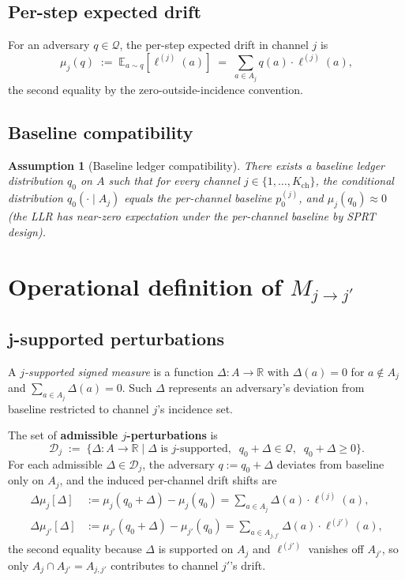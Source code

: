 \documentclass{article}
\newtheorem{assumption}{Assumption}
\newcommand{\Kch}{K_{\mathrm{ch}}}
\begin{document}
\subsection{Per-step expected drift}

For an adversary $q \in \mathcal{Q}$, the per-step expected drift
in channel $j$ is
\begin{equation}
\label{eq:drift-def}
  \mu_j(q) \;:=\; \mathbb{E}_{a \sim q}[\ell^{(j)}(a)]
  \;=\; \sum_{a \in A_j} q(a) \cdot \ell^{(j)}(a),
\end{equation}
the second equality by the zero-outside-incidence convention.

\subsection{Baseline compatibility}

\begin{assumption}[Baseline ledger compatibility]
\label{ass:baseline-compat}
There exists a baseline ledger distribution $q_0$ on $A$ such that
for every channel $j \in \{1, \ldots, \Kch\}$, the conditional
distribution $q_0(\cdot \mid A_j)$ equals the per-channel baseline
$p_0^{(j)}$, and $\mu_j(q_0) \approx 0$ (the LLR has near-zero
expectation under the per-channel baseline by SPRT design).
\end{assumption}

\section{Operational definition of \texorpdfstring{$M_{j \to j'}$}{M\_jj'}}

\subsection{j-supported perturbations}

A \emph{$j$-supported signed measure} is a function $\Delta: A \to
\mathbb{R}$ with $\Delta(a) = 0$ for $a \notin A_j$ and
$\sum_{a \in A_j} \Delta(a) = 0$.  Such $\Delta$ represents an
adversary's deviation from baseline restricted to channel $j$'s
incidence set.

The set of \textbf{admissible $j$-perturbations} is
\begin{equation}
  \mathcal{D}_j \;:=\; \{ \Delta : A \to \mathbb{R} \mid \Delta
  \text{ is $j$-supported}, \;\; q_0 + \Delta \in \mathcal{Q},
  \;\; q_0 + \Delta \geq 0 \}.
\end{equation}
For each admissible $\Delta \in \mathcal{D}_j$, the adversary
$q := q_0 + \Delta$ deviates from baseline only on $A_j$, and the
induced per-channel drift shifts are
\begin{align}
  \Delta\mu_j[\Delta] &:= \mu_j(q_0 + \Delta) - \mu_j(q_0)
    = \sum_{a \in A_j} \Delta(a) \cdot \ell^{(j)}(a), \\
  \Delta\mu_{j'}[\Delta] &:= \mu_{j'}(q_0 + \Delta) - \mu_{j'}(q_0)
    = \sum_{a \in A_{j, j'}} \Delta(a) \cdot \ell^{(j')}(a),
\end{align}
the second equality because $\Delta$ is supported on $A_j$ and
$\ell^{(j')}$ vanishes off $A_{j'}$, so only $A_j \cap A_{j'} =
A_{j,j'}$ contributes to channel $j'$'s drift.
\end{document}
